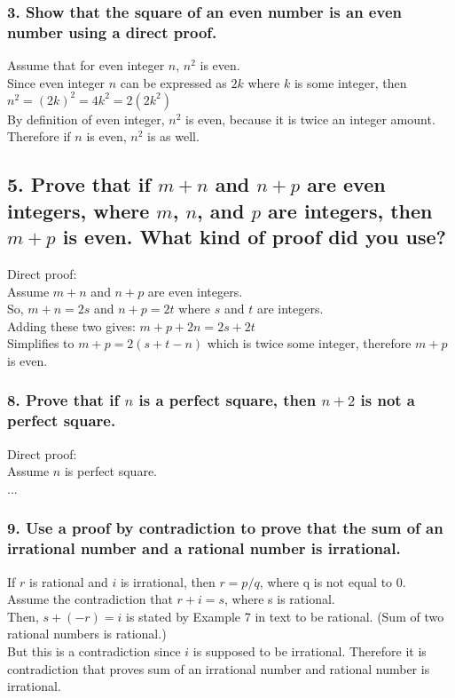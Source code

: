 \documentclass[11pt, oneside]{article} %
\numberwithin{equation}{section} %
\numberwithin{figure}{section} %
\numberwithin{table}{section} %
\begin{document}

\subsubsection{3. Show that the square of an even number is an even number using a direct proof.}
Assume that for even integer $n$, $n^2$ is even. \\  
Since even integer $n$ can be expressed as $2k$ where $k$ is some integer, then \\
$n^2 =(2k)^2 = 4k^2 = 2(2k^2) $ \\
By definition of even integer, $n^2$ is even, because it is twice an integer amount. Therefore if $n$ is even, $n^2$ is as well. 

\subsection{5. Prove that if $m + n$ and $n + p$ are even integers, where $m$, $n$, and $p$ are integers, then $m + p$ is even. What kind of proof did you use?}
Direct proof: \\
Assume $m + n$ and $n + p$ are even integers. \\
So, $m + n = 2s$ and $n + p = 2t$ where $s$ and $t$ are integers.\\
Adding these two gives: $m + p + 2n = 2s + 2t$ \\
Simplifies to $m + p = 2(s + t - n)$ which is twice some integer, therefore $m + p$ is even. 

\subsubsection{8. Prove that if $n$ is a perfect square, then $n+2$ is not a perfect square.}
Direct proof: \\
Assume $n$ is perfect square.\\
...

\subsubsection{9. Use a proof by contradiction to prove that the sum of an irrational number and a rational number is irrational.}
If $r$ is rational and $i$ is irrational, then $r = p/q$, where q is not equal to 0. \\
Assume the contradiction that $r + i = s$, where s is rational.\\
Then, $s + (-r) =i$ is stated by Example 7 in text to be rational. (Sum of two rational numbers is rational.) \\
But this is a contradiction since $i$ is supposed to be irrational. Therefore it is contradiction that proves sum of an irrational number and rational number is irrational.\\
\end{document}
